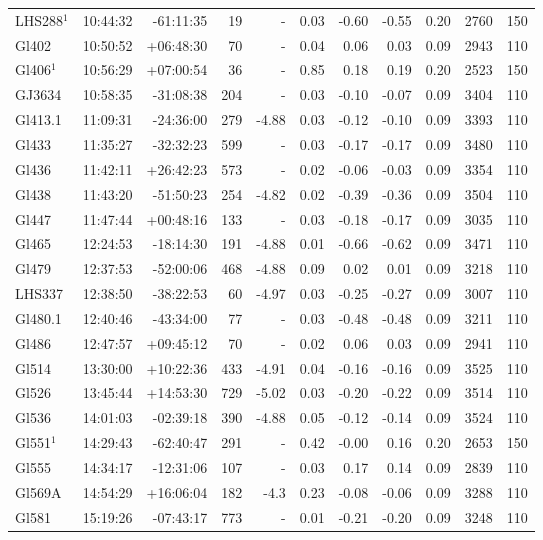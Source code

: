 \documentclass[referee]{aa}
\begin{document}
{\begin{longtable}{l r r r r r r r r r r}
LHS288$^1$ & 10:44:32 & -61:11:35 & 19 &    - & 0.03 & -0.60 & -0.55 & 0.20 & 2760 &  150 \\
Gl402 & 10:50:52 & +06:48:30 & 70 &    - & 0.04 & 0.06 & 0.03 & 0.09 & 2943 &  110 \\
Gl406$^1$ & 10:56:29 & +07:00:54 & 36 &    - & 0.85 & 0.18 & 0.19 & 0.20 & 2523 &  150 \\
GJ3634 & 10:58:35 & -31:08:38 & 204 &    - & 0.03 & -0.10 & -0.07 & 0.09 & 3404 &  110 \\
Gl413.1 & 11:09:31 & -24:36:00 & 279 & -4.88 & 0.03 & -0.12 & -0.10 & 0.09 & 3393 &  110 \\
Gl433 & 11:35:27 & -32:32:23 & 599 &    - & 0.03 & -0.17 & -0.17 & 0.09 & 3480 &  110 \\
Gl436 & 11:42:11 & +26:42:23 & 573 &    - & 0.02 & -0.06 & -0.03 & 0.09 & 3354 &  110 \\
Gl438 & 11:43:20 & -51:50:23 & 254 & -4.82 & 0.02 & -0.39 & -0.36 & 0.09 & 3504 &  110 \\
Gl447 & 11:47:44 & +00:48:16 & 133 &    - & 0.03 & -0.18 & -0.17 & 0.09 & 3035 &  110 \\
Gl465 & 12:24:53 & -18:14:30 & 191 & -4.88 & 0.01 & -0.66 & -0.62 & 0.09 & 3471 &  110 \\
Gl479 & 12:37:53 & -52:00:06 & 468 & -4.88 & 0.09 & 0.02 & 0.01 & 0.09 & 3218 &  110 \\
LHS337 & 12:38:50 & -38:22:53 & 60 & -4.97 & 0.03 & -0.25 & -0.27 & 0.09 & 3007 &  110 \\
Gl480.1 & 12:40:46 & -43:34:00 & 77 &    - & 0.03 & -0.48 & -0.48 & 0.09 & 3211 &  110 \\
Gl486 & 12:47:57 & +09:45:12 & 70 &    - & 0.02 & 0.06 & 0.03 & 0.09 & 2941 &  110 \\
Gl514 & 13:30:00 & +10:22:36 & 433 & -4.91 & 0.04 & -0.16 & -0.16 & 0.09 & 3525 &  110 \\
Gl526 & 13:45:44 & +14:53:30 & 729 & -5.02 & 0.03 & -0.20 & -0.22 & 0.09 & 3514 &  110 \\
Gl536 & 14:01:03 & -02:39:18 & 390 & -4.88 & 0.05 & -0.12 & -0.14 & 0.09 & 3524 &  110 \\
Gl551$^1$ & 14:29:43 & -62:40:47 & 291 &    - & 0.42 & -0.00 & 0.16 & 0.20 & 2653 &  150 \\
Gl555 & 14:34:17 & -12:31:06 & 107 &    - & 0.03 & 0.17 & 0.14 & 0.09 & 2839 &  110 \\
Gl569A & 14:54:29 & +16:06:04 & 182 & -4.3 & 0.23 & -0.08 & -0.06 & 0.09 & 3288 &  110 \\
Gl581 & 15:19:26 & -07:43:17 & 773 &    - & 0.01 & -0.21 & -0.20 & 0.09 & 3248 &  110 \\

\end{longtable}}
\end{document}

